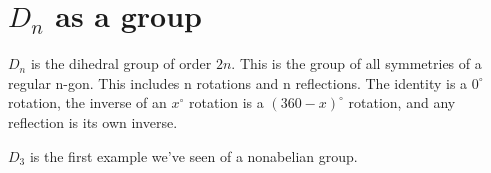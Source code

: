 \section{$D_n$ as a group}

\begin{definition}
    \label{definition : Dihedral}
    \leanok
    $D_n$ is the dihedral group of order $2n$. This is the group of all
    symmetries of a regular n-gon. This includes n rotations and n reflections.
    The identity is a $0^{\circ}$ rotation, the inverse of an $x^{\circ}$
    rotation is a $(360 - x)^{\circ}$ rotation, and any reflection is its own
    inverse.
\end{definition}

\begin{theorem}
    \label{theorem : D₃_nonabelian}
    \leanok
    $D_3$ is the first example we've seen of a nonabelian group.
\end{theorem}
